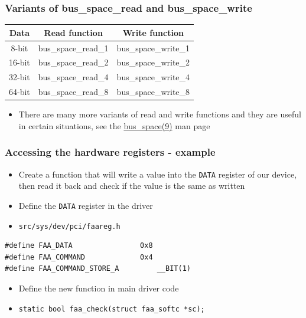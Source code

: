 \documentclass[dvipsnames,table]{beamer}
\begin{document}
\begin{frame}
\frametitle{Variants of bus\_space\_read and bus\_space\_write}
\begin{center}
\begin{tabular}{|c|c|c|}
\hline
Data & Read function & Write function \\
\hline
\hline
8-bit & bus\_space\_read\_1 & bus\_space\_write\_1 \\
\hline
16-bit & bus\_space\_read\_2 & bus\_space\_write\_2 \\
\hline
32-bit & bus\_space\_read\_4 & bus\_space\_write\_4 \\
\hline
64-bit & bus\_space\_read\_8 & bus\_space\_write\_8 \\
\hline
\end{tabular}
\end{center}
\begin{itemize}
	\item There are many more variants of read and write functions and they are useful in certain situations, see the \href{http://netbsd.gw.com/cgi-bin/man-cgi?bus_space++NetBSD-current}{bus\_space(9)} man page
\end{itemize}
\end{frame}

\begin{frame}[fragile]
\frametitle{Accessing the hardware registers - example}
\begin{itemize}
	\item Create a function that will write a value into the {\tt DATA} register of our device, then read it back and check if the value is the same as written
	\item Define the {\tt DATA} register in the driver
	\item {\tt src/sys/dev/pci/faareg.h}
\end{itemize}
\begin{lstlisting}
#define FAA_DATA                0x8
#define FAA_COMMAND             0x4
#define FAA_COMMAND_STORE_A         __BIT(1)
\end{lstlisting}
\begin{itemize}
	\item Define the new function in main driver code
	\item {\tt static bool faa\_check(struct faa\_softc *sc);}
\end{itemize}
\end{frame}
\end{document}
